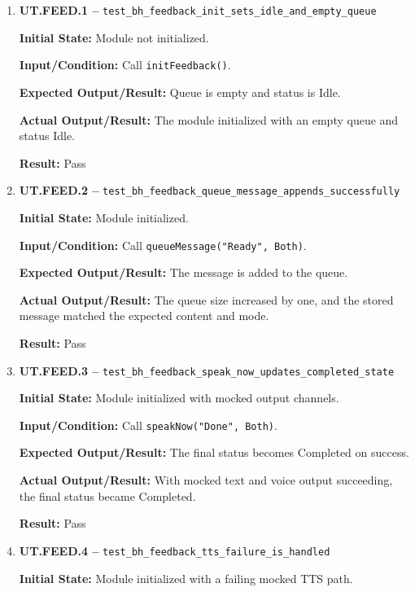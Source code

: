 \documentclass[12pt]{article}
\begin{document}
\begin{enumerate}
    \item \textbf{UT.FEED.1 --}
    \texttt{test\_bh\_feedback\_init\_sets\_idle\_and\_empty\_queue}
    
    \textbf{Initial State:} Module not initialized.
    
    \textbf{Input/Condition:} Call \texttt{initFeedback()}.
    
    \textbf{Expected Output/Result:} Queue is empty and status is
    Idle.
    
    \textbf{Actual Output/Result:} The module initialized with an
    empty queue and status Idle.
    
    \textbf{Result:} Pass
    
    \item \textbf{UT.FEED.2 --}
    \texttt{test\_bh\_feedback\_queue\_message\_appends\_successfully}
    
    \textbf{Initial State:} Module initialized.
    
    \textbf{Input/Condition:} Call
    \texttt{queueMessage("Ready", Both)}.
    
    \textbf{Expected Output/Result:} The message is added to the
    queue.
    
    \textbf{Actual Output/Result:} The queue size increased by one,
    and the stored message matched the expected content and mode.
    
    \textbf{Result:} Pass
    
    \item \textbf{UT.FEED.3 --}
    \texttt{test\_bh\_feedback\_speak\_now\_updates\_completed\_state}
    
    \textbf{Initial State:} Module initialized with mocked output
    channels.
    
    \textbf{Input/Condition:} Call \texttt{speakNow("Done", Both)}.
    
    \textbf{Expected Output/Result:} The final status becomes
    Completed on success.
    
    \textbf{Actual Output/Result:} With mocked text and voice output
    succeeding, the final status became Completed.
    
    \textbf{Result:} Pass
    
    \item \textbf{UT.FEED.4 --}
    \texttt{test\_bh\_feedback\_tts\_failure\_is\_handled}
    
    \textbf{Initial State:} Module initialized with a failing mocked
    TTS path.
    

\end{enumerate}
\end{document}
